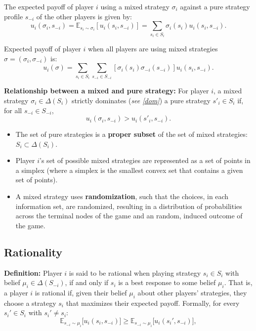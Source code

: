 \documentclass{article}
\begin{document}
\noindent The expected payoff of player \(i\) using a mixed strategy \(\sigma_i\) against a pure strategy profile \(s_{-i}\) of the other players is given by:
\[
u_i(\sigma_i, s_{-i}) = \mathbb{E}_{s_i \sim \sigma_i}[u_i(s_i, s_{-i})] = \sum_{s_i \in S_i} \sigma_i(s_i) u_i(s_i, s_{-i}).
\]

\noindent Expected payoff of player \(i\) when all players are using mixed strategies \(\sigma = (\sigma_i, \sigma_{-i})\) is:
\[
u_i(\sigma) = \sum_{s_i \in S_i} \sum_{s_{-i} \in S_{-i}} [\sigma_i(s_i) \sigma_{-i}(s_{-i})] u_i(s_i, s_{-i}).
\]

\noindent \textbf{Relationship between a mixed and pure strategy:} For player \(i\), a mixed strategy \(\sigma_i \in \Delta(S_i)\) strictly dominates (\textit{see \ref{dom}}) a pure strategy \(s'_i \in S_i\) if, for all \(s_{-i} \in S_{-i}\),
\[
u_i(\sigma_i, s_{-i}) > u_i(s'_i, s_{-i}).
\]
\begin{itemize}
    \item The set of pure strategies is a \textbf{proper subset} of the set of mixed strategies: $S_i \subset \Delta(S_i)$.
    \item Player $i$'s set of possible mixed strategies are represented as a set of points in a simplex (where a simplex is the smallest convex set that contains a given set of points).
    \item A mixed strategy uses \textbf{randomization}, such that the choices, in each information set, are randomized, resulting in a distribution of probabilities across the terminal nodes of the game and an random, induced outcome of the game. 
\end{itemize}


\subsection{Rationality}\label{rationality}
\textbf{Definition:} Player \( i \) is said to be rational when playing strategy \( s_i \in S_i \) with belief \( \mu_i \in \Delta(S_{-i}) \), if and only if \( s_i \) is a best response to some belief \( \mu_i \). That is, a player \( i \) is rational if, given their belief \( \mu_i \) about other players' strategies, they choose a strategy \( s_i \) that maximizes their expected payoff. Formally, for every \( s_i' \in S_i \) with \( s_i' \neq s_i \):
\[
\mathbb{E}_{s_{-i} \sim \mu_i} \big[ u_i(s_i, s_{-i}) \big] \geq \mathbb{E}_{s_{-i} \sim \mu_i} \big[ u_i(s_i', s_{-i}) \big],
\]
\end{document}
